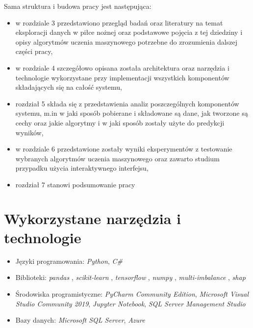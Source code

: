 \noindent Sama struktura i budowa pracy jest następująca:
\begin{itemize}
    \item w rozdziale 3 przedstawiono przegląd badań oraz literatury na temat eksploracji danych w piłce nożnej oraz podstawowe pojęcia z tej dziedziny i opisy algorytmów uczenia maszynowego potrzebne do zrozumienia dalszej części pracy,
    \item w rozdziale 4 szczegółowo opisana została architektura oraz narzędzia i technologie wykorzystane przy implementacji wszystkich komponentów składających się na całość systemu,
    \item rozdział 5 składa się z przedstawienia  analiz poszczególnych komponentów systemu, m.in w jaki sposób pobierane i składowane są dane, jak tworzone są cechy oraz jakie algorytmy i w jaki sposób zostały użyte do predykcji wyników,
    \item w rozdziale 6 przedstawione zostały wyniki eksperymentów z testowanie wybranych algorytmów uczenia maszynowego oraz zawarto studium przypadku użycia interaktywnego interfejsu,
    \item rozdział 7 stanowi podsumowanie pracy
\end{itemize}

\section{Wykorzystane narzędzia i technologie}
\begin{itemize}
    \item Języki programowania: \textit{Python}, \textit{C\#}
    \item Biblioteki: \textit{pandas} \cite{reback2020pandas}, \textit{scikit-learn} \cite{scikit-learn}, \textit{tensorflow} \cite{tensorflow2015-whitepaper}, \textit{numpy} \cite{harris2020array}, \textit{multi-imbalance} \cite{MultiImbalance2020}, \textit{shap} \cite{NIPS2017_7062}
    \item Środowiska programistyczne: \textit{PyCharm Community Edition}, \textit{Microsoft Visual Studio Community 2019}, \textit{Jupyter Notebook}, \textit{SQL Server Management Studio}
    \item Bazy danych: \textit{Microsoft SQL Server}, \textit{Azure}
\end{itemize}

